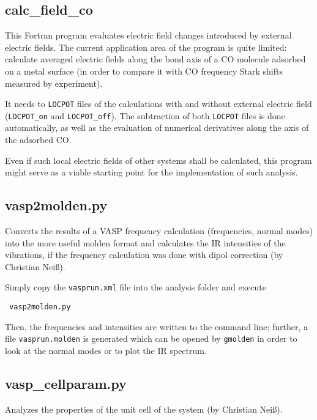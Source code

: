 \documentclass[a4paper,11pt]{article}
\begin{document}
\subsection{calc\_field\_co}\label{calc_field_co}

This Fortran program evaluates electric field changes introduced by external electric fields.
The current application area of the program is quite limited: calculate averaged electric fields
along the bond axis of a CO molecule adsorbed on a metal surface (in order to compare it
with CO frequency Stark shifts measured by experiment).

It needs to \texttt{LOCPOT} files of the calculations with and without external electric field
(\texttt{LOCPOT\_on} and \texttt{LOCPOT\_off}).
The subtraction of both \texttt{LOCPOT} files is done automatically, as well as the
evaluation of numerical derivatives along the axis of the adsorbed CO.

Even if such local electric fields of other systems shall be calculated, this program might
serve as a viable starting point for the implementation of such analysis.

\subsection{vasp2molden.py}\label{vasp2molden}

Converts the results of a VASP frequency calculation (frequencies, normal modes) into the 
more useful molden format and calculates the IR intensities of the vibrations, if the frequency 
calculation was done with dipol correction (by Christian Neiß).

Simply copy the \texttt{vasprun.xml} file into the analysis folder and execute 

\begin{verbatim}
 vasp2molden.py
\end{verbatim}

Then, the frequencies and intensities are written to the command line; further, a file 
\texttt{vasprun.molden} is generated which can be opened by \texttt{gmolden} in order to
look at the normal modes or to plot the IR spectrum.

\subsection{vasp\_cellparam.py}\label{vasp_cellparam}

Analyzes the properties of the unit cell of the system (by Christian Neiß).
\end{document}
